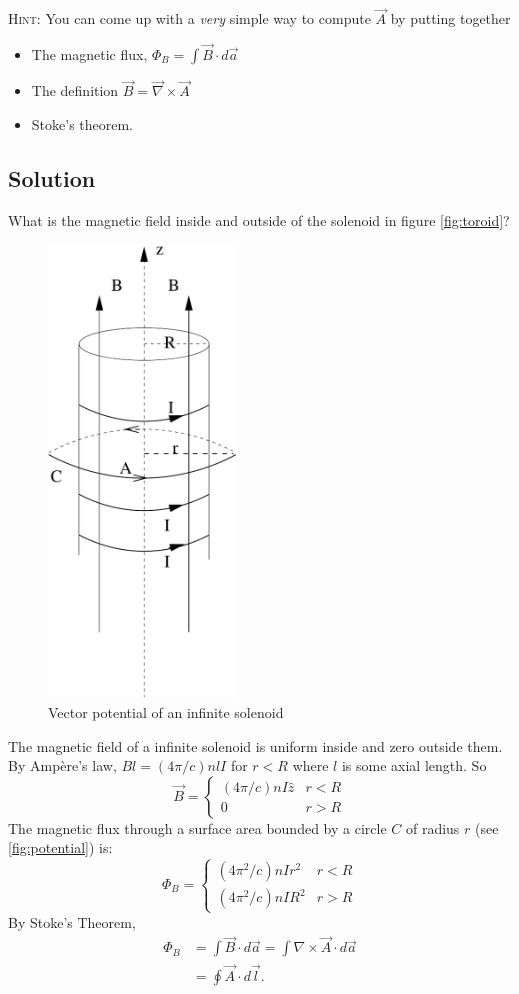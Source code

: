 \documentclass[solutions]{esg8022pset}
\begin{document}
  \noindent \textsc{Hint}: You can come up with a \emph{very} simple way to
  compute $\vec A$ by putting together
  \begin{itemize}
    \item The magnetic flux, $\Phi_B = \int \vec B\cdot d\vec a$
    \item The definition $\vec B = \vec\nabla\times\vec A$
    \item Stoke's theorem.
  \end{itemize}
\subsection{Solution}
  What is the magnetic field inside and outside of the solenoid in figure \autoref{fig:toroid}?
  \begin{figure}[H]
    \centering
    \includegraphics[width = 5cm]{vecpot7}
    \caption{Vector potential of an infinite solenoid}
    \label{fig:potential}
  \end{figure}
  The magnetic field of a infinite solenoid is uniform inside and zero outside
  them.  By Amp\`{e}re's law, $Bl=(4\pi/c)nlI$ for $r<R$ where $l$ is some axial
  length.  So
  \begin{equation}
    \vec{B}= \begin{cases} (4\pi/c)nI\hat{z} & r<R\\0 & r>R \end{cases}
  \end{equation}
  The  magnetic flux through a surface area bounded by a circle $C$ of radius
  $r$ (see \autoref{fig:potential}) is:
  \begin{equation}
    \Phi_B = \begin{cases} (4\pi^2/c)nIr^2 & r<R\\ (4\pi^2/c)nIR^2 & r>R \end{cases}
  \end{equation}
  By Stoke's Theorem,
  \begin{align*}
    \Phi_B & = \int \vec{B}\cdot d\vec{a}=\int \nabla\times\vec{A}\cdot d\vec{a}\\
           & = \oint \vec{A}\cdot d\vec{l}.
  \end{align*}
\end{document}
